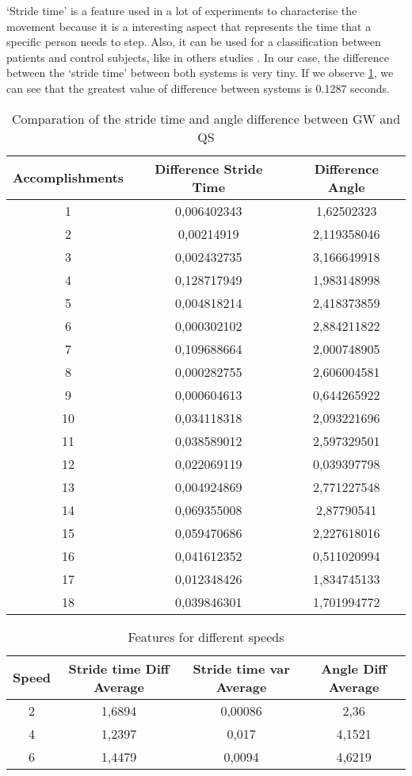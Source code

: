 ‘Stride time’ is a feature used in a lot of experiments to characterise the movement because it is a interesting aspect that represents the time that a specific person needs to step. Also, it can be used for a classification between patients and control subjects, like in others studies \cite{Hausdorff}.
In our case, the difference between  the ‘stride time’ between both systems is very tiny. If we observe \ref{tab:Stride_time}, we can see that the greatest value of difference between systems is 0.1287 seconds.

\begin{table}[h]
	\caption{Comparation of the stride time and angle difference between GW and QS}	
	\centering
	\begin{tabular}{|c|c|c|}\hline
		
		Accomplishments & Difference Stride Time	& Difference Angle	 	\\ \hline
		1  & 0,006402343	 & 1,62502323 \\
		2 & 0,00214919	& 2,119358046 \\
		3 & 0,002432735	& 3,166649918 \\
		4 & 0,128717949	& 1,983148998 \\
		5 & 0,004818214	& 2,418373859 \\
		6 & 0,000302102	& 2,884211822 \\
		7 & 0,109688664	& 2,000748905 \\
		8 & 0,000282755	& 2,606004581 \\
		9 & 0,000604613	 & 0,644265922 \\
		10 & 0,034118318	& 2,093221696 \\
		11 & 0,038589012	& 2,597329501 \\
		12 & 0,022069119	& 0,039397798 \\
		13 & 0,004924869	& 2,771227548 \\
		14 & 0,069355008	& 2,87790541 \\
		15 & 0,059470686	& 2,227618016 \\
		16 & 0,041612352	& 0,511020994 \\
		17 & 0,012348426	& 1,834745133 \\
		18 & 0,039846301	& 1,701994772 
	\\ \hline
	\end{tabular}
	\label{tab:Stride_time}
	
\end{table}

\begin{table}[h]
	\caption{Features for different speeds}	
	\centering
	\begin{tabular}{|c|c|c|c|}\hline
		
		Speed & Stride time Diff Average & Stride time var Average & Angle Diff Average	 	\\ \hline
		2  & 1,6894	 & 0,00086 & 2,36 \\
		4 & 1,2397	& 0,017 & 4,1521\\
		6 & 1,4479 & 0,0094	& 4,6219
		\\ \hline
	\end{tabular}
	\label{tab:speeds}
	
\end{table}

